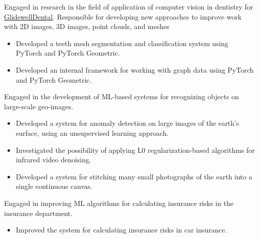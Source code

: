

Engaged in research in the field of application of computer vision in dentistry for \href{https://glidewelldental.com/}{GlidewellDental}. Responsible for developing new approaches to improve work with 2D images, 3D images, point clouds, and meshes

\begin{itemize}
	\item Developed a teeth mesh segmentation and classification system using PyTorch and PyTorch Geometric.
	\item Developed an internal framework for working with graph data using PyTorch and PyTorch Geometric.
\end{itemize}

\divider


Engaged in the development of ML-based systems for recognizing objects on large-scale geo-images.

\begin{itemize}
	\item Developed a system for anomaly detection on large images of the earth's surface, using an unsupervised learning approach.
	\item Investigated the possibility of applying L0 regularization-based algorithms for infrared video denoising.
	\item Developed a system for stitching many small photographs of the earth into a single continuous canvas.
\end{itemize}

\divider



Engaged in improving ML algorithms for calculating insurance risks in the insurance department.

\begin{itemize}
	\item Improved the system for calculating insurance risks in car insurance.
\end{itemize}


